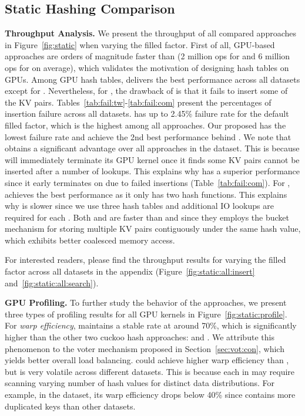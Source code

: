 \subsection{Static Hashing Comparison}\label{sec:exp:static}

\vspace{1mm}\noindent\textbf{Throughput Analysis.} We present the throughput of all compared approaches in Figure~\ref{fig:static} when varying the filled factor. 
First of all, GPU-based approaches are orders of magnitude faster than \google (2  million ops for  and 6 million ops for  on average), which validates the motivation of designing hash tables on GPUs. 
Among GPU hash tables, \megakv delivers the best performance across all datasets except for \dsali. Nevertheless, for , the drawback of \megakv is that it fails to insert some of the KV pairs. Tables~\ref{tab:fail:tw}-\ref{tab:fail:com} present the percentages of insertion failure across all datasets. \megakv has up to 2.45\% failure rate for the default filled factor, which is the highest among all approaches. 
Our proposed \voter has the lowest failure rate and achieve the 2nd best performance behind \megakv. We note that \cudpp obtains a significant advantage over all approaches in the \dsali dataset. This is because \cudpp will immediately terminate its GPU kernel once it finds some KV pairs cannot be inserted after a number of lookups. This explains why \cudpp has a superior performance since it early terminates on \dsali due to failed insertions (Table~\ref{tab:fail:com}). For , \megakv achieves the best performance as it only has two hash functions. This explains why \voter is slower since we use three hash tables and additional IO lookups are required for each . Both \megakv and \voter are faster than \cudpp and \linear since they employs the bucket mechanism for storing multiple KV pairs contiguously under the same hash value, which exhibits better coalesced memory access.  

For interested readers, please find the throughput results for varying the filled factor across all datasets in the appendix (Figure~\ref{fig:static:all:insert} and~\ref{fig:static:all:search}). 


\vspace{1mm}\noindent\textbf{GPU Profiling.} To further study the behavior of the approaches, we present three types of profiling results for all  GPU kernels in Figure~\ref{fig:static:profile}.
For \emph{warp efficiency}, \voter maintains a stable rate at around 70\%, which is significantly higher than the other two cuckoo hash approaches: \megakv and \cudpp.  
We attribute this phenomenon to the voter mechanism proposed in Section~\ref{sec:vot:con}, which yields better overall load balancing. 
\linear could achieve higher warp efficiency than \voter, but is very volatile across different datasets. This is because each  in \linear may require scanning varying number of hash values for distinct data distributions. 
For example, in the \dsali dataset, its warp efficiency drops below 40\% since \dsali contains more duplicated keys than other datasets. 

